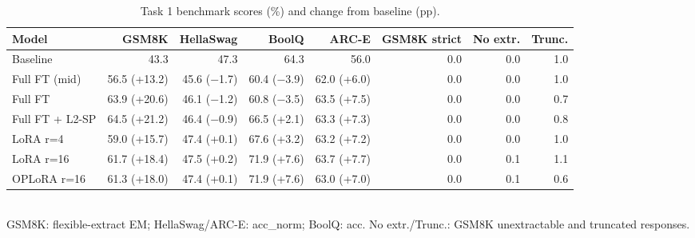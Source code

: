 \begin{table}[t]
\centering
\small
\begin{tabular}{lrrrrrrr}
\toprule
Model & GSM8K & HellaSwag & BoolQ & ARC-E & GSM8K strict & No extr. & Trunc. \\
\midrule
Baseline & 43.3 & 47.3 & 64.3 & 56.0 & 0.0 & 0.0 & 1.0 \\
\midrule
Full FT (mid) & 56.5 (+13.2) & 45.6 ($-$1.7) & 60.4 ($-$3.9) & 62.0 (+6.0) & 0.0 & 0.0 & 1.0 \\
Full FT & 63.9 (+20.6) & 46.1 ($-$1.2) & 60.8 ($-$3.5) & 63.5 (+7.5) & 0.0 & 0.0 & 0.7 \\
\midrule
Full FT + L2-SP & 64.5 (+21.2) & 46.4 ($-$0.9) & 66.5 (+2.1) & 63.3 (+7.3) & 0.0 & 0.0 & 0.8 \\
LoRA r=4 & 59.0 (+15.7) & 47.4 (+0.1) & 67.6 (+3.2) & 63.2 (+7.2) & 0.0 & 0.0 & 1.0 \\
LoRA r=16 & 61.7 (+18.4) & 47.5 (+0.2) & 71.9 (+7.6) & 63.7 (+7.7) & 0.0 & 0.1 & 1.1 \\
OPLoRA r=16 & 61.3 (+18.0) & 47.4 (+0.1) & 71.9 (+7.6) & 63.0 (+7.0) & 0.0 & 0.1 & 0.6 \\
\bottomrule
\end{tabular}
\\[2pt]{\footnotesize GSM8K: flexible-extract EM; HellaSwag/ARC-E: acc\_norm; BoolQ: acc. No extr./Trunc.: GSM8K unextractable and truncated responses.}
\caption{Task 1 benchmark scores (\%) and change from baseline (pp).}
\label{tab:t1-bench}
\end{table}
